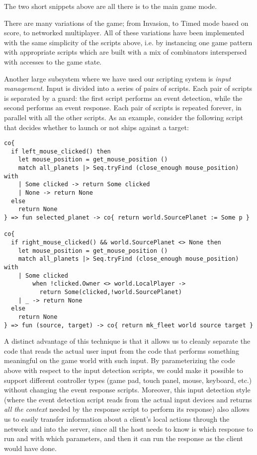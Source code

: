 The two short snippets above are all there is to the main game mode.

There are many variations of the game; from Invasion, to Timed mode based on score, to networked multiplayer. All of these variations have been implemented with the same simplicity of the scripts above, i.e. by instancing one game pattern with appropriate scripts which are built with a mix of combinators interspersed with accesses to the game state.

Another large subsystem where we have used our scripting system is \textit{input management}. Input is divided into a series of pairs of scripts. Each pair of scripts is separated by a guard: the first script performs an event detection, while the second performs an event response. Each pair of scripts is repeated forever, in parallel with all the other scripts. As an example, consider the following script that decides whether to launch or not ships against a target:

\begin{lstlisting}
co{
  if left_mouse_clicked() then
    let mouse_position = get_mouse_position ()
    match all_planets |> Seq.tryFind (close_enough mouse_position) with
    | Some clicked -> return Some clicked
    | None -> return None
  else
    return None
} => fun selected_planet -> co{ return world.SourcePlanet := Some p }

co{
  if right_mouse_clicked() && world.SourcePlanet <> None then
    let mouse_position = get_mouse_position ()
    match all_planets |> Seq.tryFind (close_enough mouse_position) with
    | Some clicked 
        when !clicked.Owner <> world.LocalPlayer -> 
          return Some(clicked,!world.SourcePlanet)
    | _ -> return None
  else
    return None
} => fun (source, target) -> co{ return mk_fleet world source target }
\end{lstlisting}


A distinct advantage of this technique is that it allows us to cleanly separate the code that reads the actual user input from the code that performs something meaningful on the game world with such input. By parameterizing the code above with respect to the input detection scripts, we could make it possible to support different controller types (game pad, touch panel, mouse, keyboard, etc.) without changing the event response scripts. Moreover, this input detection style (where the event detection script reads from the actual input devices and returns \textit{all the context} needed by the response script to perform its response) also allows us to easily transfer information about a client's local actions through the network and into the server, since all the host needs to know is which response to run and with which parameters, and then it can run the response as the client would have done.

